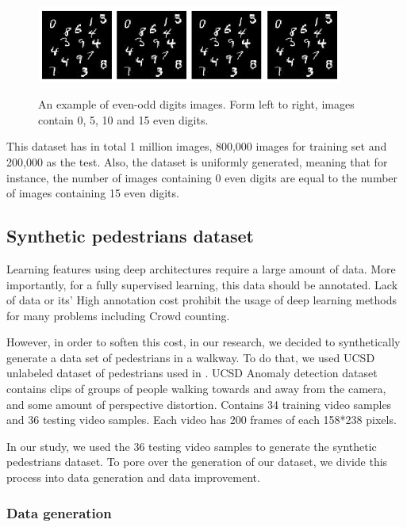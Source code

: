 \begin{figure}[H]
	\centering
	{\includegraphics[width=0.9\textwidth]{images/l2cmnist}}
		\caption{An example of even-odd digits images. Form left to right, images contain 0, 5, 10 and 15 even digits.}
	\label{fig:l2cmnist}
\end{figure}

\indent This dataset has in total 1 million images, 800,000 images for training set and 200,000 as the test. Also, the dataset is uniformly generated, meaning that for instance, the number of images containing 0 even digits are equal to the number of images containing 15 even digits.  

\subsection{Synthetic pedestrians dataset}

Learning features using deep architectures require a large amount of data. More importantly, for a fully supervised learning, this data should be annotated. Lack of data or its' High annotation cost prohibit the usage of deep learning methods for many problems including Crowd counting. 

\indent However, in order to soften this cost, in our research, we decided to synthetically generate a data set of pedestrians in a walkway. To do that, we used UCSD unlabeled dataset of pedestrians used in \cite{chan2009analysis, mahadevan2010anomaly, li2014anomaly}. UCSD Anomaly detection dataset contains clips of groups of people walking towards and away from the camera, and some amount of perspective distortion. Contains 34 training video samples and 36 testing video samples. Each video has 200 frames of each 158*238 pixels.


\indent In our study, we used the 36 testing video samples to generate the synthetic pedestrians dataset. To pore over the generation of our dataset, we divide this process into data generation and data improvement.

  
\subsubsection{Data generation}

